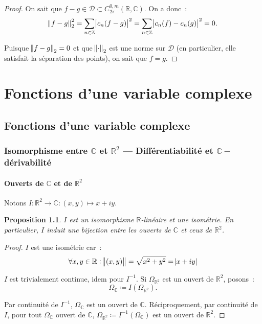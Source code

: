 \documentclass{report}
\newtheorem{prp}[thm]{Proposition}
\theoremstyle{definition}
\theoremstyle{remark}
\numberwithin{equation}{section}
\newcommand{\C}{\mathbb C}
\newcommand{\R}{\mathbb R}
\newcommand{\Z}{\mathbb Z}
\newcommand{\CmT}[2]{C^{#1,m}_{#2}}
\newcommand{\CzmT}[1]{\CmT 0{#1}}
\newcommand{\Czm}{\CzmT{2\pi}}
\begin{document}
			\begin{proof} On sait que $f-g \in \mathcal D \subset \Czm(\R, \C)$. On a donc~:
			\begin{equation}
				\norm {f-g}_2^2 = \sum_{n \in \Z}\abs {c_n(f-g)}^2 = \sum_{n \in \Z}\abs {c_n(f) - c_n(g)}^2 = 0.
			\end{equation}

			Puisque $\norm {f-g}_2 = 0$ et que $\norm \cdot_2$ est une norme sur $\mathcal D$ (en particulier, elle satisfait la séparation des points), on sait que
			$f = g$.
			\end{proof}

\part{Fonctions d'une variable complexe}
\chapter{Fonctions d'une variable complexe}
	\section{Isomorphisme entre $\C$  et $\R^2$ --- Différentiabilité et $\C-$dérivabilité}
		\subsection{Ouverts de $\C$ et de $\R^2$}
			Notons $I : \R^2 \to \C : (x, y) \mapsto x + iy$.

			\begin{prp} $I$ est un isomorphisme $\R$-linéaire et une isométrie. En particulier, $I$ induit une bijection entre les ouverts de $\C$ et ceux de $\R^2$.
			\end{prp}

			\begin{proof} $I$ est une isométrie car~:
			\begin{equation}
				\forall x, y \in \R : \norm {(x, y)} = \sqrt {x^2 + y^2} = \abs {x+iy}
			\end{equation}

			$I$ est trivialement continue, idem pour $I^{-1}$. Si $\Omega_{\R^2}$ est un ouvert de $\R^2$, posons~:
			\begin{equation}
				\Omega_\C \coloneqq I(\Omega_{\R^2}).
			\end{equation}

			Par continuité de $I^{-1}$, $\Omega_\C$ est un ouvert de $\C$. Réciproquement, par continuité de $I$, pour tout $\Omega_\C$ ouvert de $\C$,
			$\Omega_{\R^2} \coloneqq I^{-1}(\Omega_\C)$ est un ouvert de $\R^2$.
			\end{proof}
\end{document}
